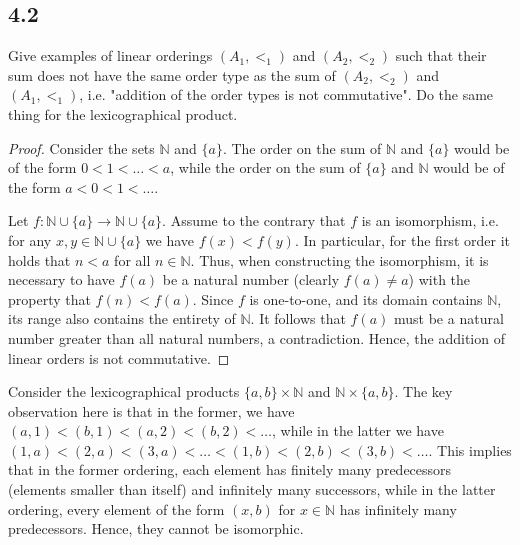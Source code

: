 \subsection*{4.2}
Give examples of linear orderings $(A_1, <_1)$ and $(A_2, <_2)$ such that their sum does not have the same order type as the sum of $(A_2, <_2)$ and $(A_1, <_1)$, i.e. "addition of the order types is not commutative". Do the same thing for the lexicographical product.

\begin{proof}
Consider the sets $\mathbb{N}$ and $\{a\}$. The order on the sum of $\mathbb{N}$ and $\{a\}$ would be of the form $0<1<\dots<a$, while the order on the sum of $\{a\}$ and $\mathbb{N}$ would be of the form $a < 0< 1< \dots$.

Let $f : \mathbb{N} \cup \{a\} \rightarrow \mathbb{N} \cup \{a\}$. Assume to the contrary that $f$ is an isomorphism, i.e. for any $x,y \in \mathbb{N} \cup \{a\}$ we have $f(x) < f(y)$. In particular, for the first order it holds that $n < a$ for all $n \in \mathbb{N}$. Thus, when constructing the isomorphism, it is necessary to have $f(a)$ be a natural number (clearly $f(a) \neq a$) with the property that $f(n) < f(a)$. Since $f$ is one-to-one, and its domain contains $\mathbb{N}$, its range also contains the entirety of $\mathbb{N}$. It follows that $f(a)$ must be a natural number greater than all natural numbers, a contradiction. Hence, the addition of linear orders is not commutative.

\end{proof}

Consider the lexicographical products $\{a,b\} \times \mathbb{N}$ and  $\mathbb{N} \times \{a,b\}$. The key observation here is that in the former, we have $(a, 1) < (b, 1) < (a, 2) < (b, 2) < \dots$, while in the latter we have $(1, a) < (2, a) < (3, a) < \dots < (1, b) < (2, b) < (3,b) < \dots$. This implies that in the former ordering, each element has finitely many predecessors (elements smaller than itself) and infinitely many successors, while in the latter ordering, every element of the form $(x, b)$ for $x \in \mathbb{N}$ has infinitely many predecessors. Hence, they cannot be isomorphic.


